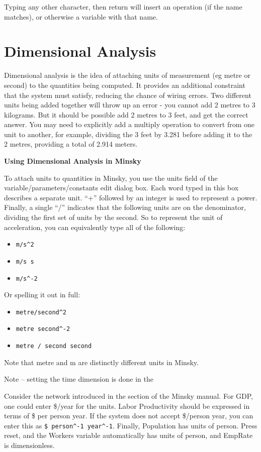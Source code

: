 Typing any other character, then return will insert an operation (if
the name matches), or otherwise a variable with that name.

\section{Dimensional Analysis}

\label{dimensional analysis}

Dimensional analysis is the idea of attaching units of measurement
(eg metre or second) to the quantities being computed. It provides
an additional constraint that the system must satisfy, reducing the
chance of wiring errors. Two different units being added together
will throw up an error - you cannot add 2 metres to 3 kilograms. But
it should be possible add 2 metres to 3 feet, and get the correct
answer. You may need to explicitly add a multiply operation to convert
from one unit to another, for example, dividing the 3 feet by 3.281
before adding it to the 2 metres, providing a total of 2.914 meters.

\textbf{Using Dimensional Analysis in Minsky}

To attach units to quantities in Minsky, you use the units field of
the variable/parameters/constants edit dialog box. Each word typed
in this box describes a separate unit. ``\^{\ensuremath{+}}'' followed
by an integer is used to represent a power. Finally, a single ``/''
indicates that the following units are on the denominator, dividing
the first set of units by the second. So to represent the unit of
acceleration, you can equivalently type all of the following:
\begin{itemize}
\item \verb+m/s^2+ 
\item \verb+m/s s+ 
\item \verb+m/s^-2+ 
\end{itemize}
Or spelling it out in full:
\begin{itemize}
\item \verb+metre/second^2+ 
\item \verb+metre second^-2+ 
\item \verb+metre / second second+ 
\end{itemize}
Note that metre and m are distinctly different units in Minsky.

Note -- setting the time dimension is done in the 

Consider the network introduced in the 
section of the Minsky manual. For GDP, one could enter \$/year for
the units. Labor Productivity should be expressed in terms of \$ per
person year. If the system does not accept \$/person year, you can
enter this as \verb+$ person^-1 year^-1+. Finally, Population has
units of person. Press reset, and the Workers variable automatically
has units of person, and EmpRate is dimensionless.

